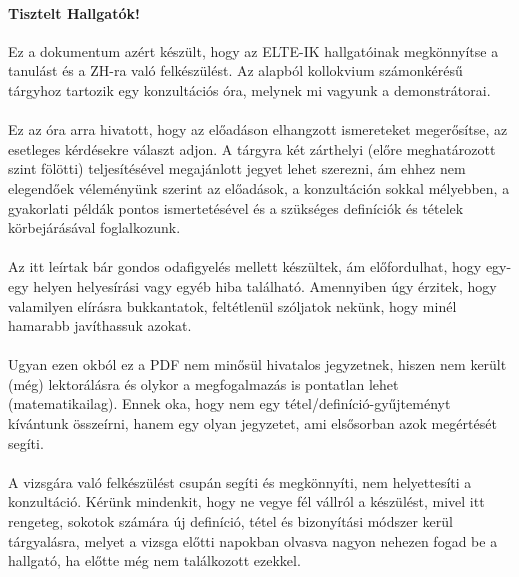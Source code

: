 \documentclass[12pt]{article}
\begin{document}
	\tableofcontents
	\newpage
	
	\paragraph{Tisztelt Hallgatók!} Ez a dokumentum azért készült, hogy az ELTE-IK hallgatóinak megkönnyítse a tanulást és a ZH-ra való felkészülést. Az alapból kollokvium számonkérésű tárgyhoz tartozik egy konzultációs óra, melynek mi vagyunk a demonstrátorai.
	
	\paragraph{}Ez az óra arra hivatott, hogy az előadáson elhangzott ismereteket megerősítse, az esetleges kérdésekre választ adjon. A tárgyra két zárthelyi (előre meghatározott szint fölötti) teljesítésével megajánlott jegyet lehet szerezni, ám ehhez nem elegendőek véleményünk szerint az előadások, a konzultáción sokkal mélyebben, a gyakorlati példák pontos ismertetésével és a szükséges definíciók és tételek körbejárásával foglalkozunk.
	\paragraph{}Az itt leírtak bár gondos odafigyelés mellett készültek, ám előfordulhat, hogy egy-egy helyen helyesírási vagy egyéb hiba található. Amennyiben úgy érzitek, hogy valamilyen elírásra bukkantatok, feltétlenül szóljatok nekünk, hogy minél hamarabb javíthassuk azokat.
	\paragraph{}Ugyan ezen okból ez a PDF nem minősül hivatalos jegyzetnek, hiszen nem került (még) lektorálásra és olykor a megfogalmazás is pontatlan lehet (matematikailag). Ennek oka, hogy nem egy tétel/definíció-gyűjteményt kívántunk összeírni, hanem egy olyan jegyzetet, ami elsősorban azok megértését segíti.
	\paragraph{}A vizsgára való felkészülést csupán segíti és megkönnyíti, nem helyettesíti a konzultáció. Kérünk mindenkit, hogy ne vegye fél vállról a készülést, mivel itt rengeteg, sokotok számára új definíció, tétel és bizonyítási módszer kerül tárgyalásra, melyet a vizsga előtti napokban olvasva nagyon nehezen fogad be a hallgató, ha előtte még nem találkozott ezekkel.
\end{document}
